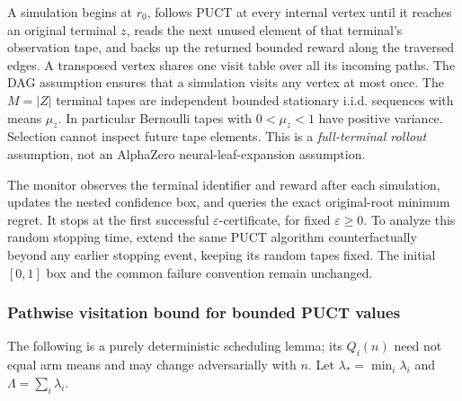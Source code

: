 \documentclass{article}
\theoremstyle{plain}
\theoremstyle{definition}
\begin{document}
A simulation begins at $r_0$, follows PUCT at every internal vertex until it
reaches an original terminal $z$, reads the next unused element of that
terminal's observation tape, and backs up the returned bounded reward along
the traversed edges. A transposed vertex shares one visit table over all its
incoming paths. The DAG assumption ensures that a simulation visits any
vertex at most once. The $M=|Z|$ terminal tapes are independent bounded
stationary i.i.d. sequences with means $\mu_z$. In particular Bernoulli tapes
with $0<\mu_z<1$ have positive variance. Selection cannot inspect future tape
elements. This is a \emph{full-terminal rollout} assumption, not an AlphaZero
neural-leaf-expansion assumption.

The monitor observes the terminal identifier and reward after each simulation,
updates the nested confidence box, and queries the exact original-root minimum regret.
It stops at the first successful $\varepsilon$-certificate, for fixed
$\varepsilon\ge0$. To analyze this random stopping time, extend the same PUCT
algorithm counterfactually beyond any earlier stopping event, keeping its
random tapes fixed. The initial $[0,1]$ box and the common failure convention remain
unchanged.

\subsubsection{Pathwise visitation bound for bounded PUCT values}
\label{sec:v35local}
The following is a purely deterministic scheduling lemma; its $Q_i(n)$ need
not equal arm means and may change adversarially with $n$. Let
$\lambda_*=\min_i\lambda_i$ and $\Lambda=\sum_i\lambda_i$.
\end{document}

